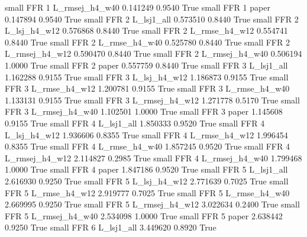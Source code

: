      small      FFR                 1 L_rmsej_h4_w40   0.141249      0.9540    True
     small      FFR                 1          paper   0.147894      0.9540    True
     small      FFR                 2     L_lsj1_all   0.573510      0.8440    True
     small      FFR                 2   L_lsj_h4_w12   0.576868      0.8440    True
     small      FFR                 2  L_rmse_h4_w12   0.554741      0.8440    True
     small      FFR                 2  L_rmse_h4_w40   0.525780      0.8440    True
     small      FFR                 2 L_rmsej_h4_w12   0.590470      0.8440    True
     small      FFR                 2 L_rmsej_h4_w40   0.506194      1.0000    True
     small      FFR                 2          paper   0.557759      0.8440    True
     small      FFR                 3     L_lsj1_all   1.162288      0.9155    True
     small      FFR                 3   L_lsj_h4_w12   1.186873      0.9155    True
     small      FFR                 3  L_rmse_h4_w12   1.200781      0.9155    True
     small      FFR                 3  L_rmse_h4_w40   1.133131      0.9155    True
     small      FFR                 3 L_rmsej_h4_w12   1.271778      0.5170    True
     small      FFR                 3 L_rmsej_h4_w40   1.102501      1.0000    True
     small      FFR                 3          paper   1.145608      0.9155    True
     small      FFR                 4     L_lsj1_all   1.850333      0.9520    True
     small      FFR                 4   L_lsj_h4_w12   1.936606      0.8355    True
     small      FFR                 4  L_rmse_h4_w12   1.996454      0.8355    True
     small      FFR                 4  L_rmse_h4_w40   1.857245      0.9520    True
     small      FFR                 4 L_rmsej_h4_w12   2.114827      0.2985    True
     small      FFR                 4 L_rmsej_h4_w40   1.799468      1.0000    True
     small      FFR                 4          paper   1.847186      0.9520    True
     small      FFR                 5     L_lsj1_all   2.616930      0.9250    True
     small      FFR                 5   L_lsj_h4_w12   2.771639      0.7025    True
     small      FFR                 5  L_rmse_h4_w12   2.919777      0.7025    True
     small      FFR                 5  L_rmse_h4_w40   2.669995      0.9250    True
     small      FFR                 5 L_rmsej_h4_w12   3.022634      0.2400    True
     small      FFR                 5 L_rmsej_h4_w40   2.534098      1.0000    True
     small      FFR                 5          paper   2.638442      0.9250    True
     small      FFR                 6     L_lsj1_all   3.449620      0.8920    True
